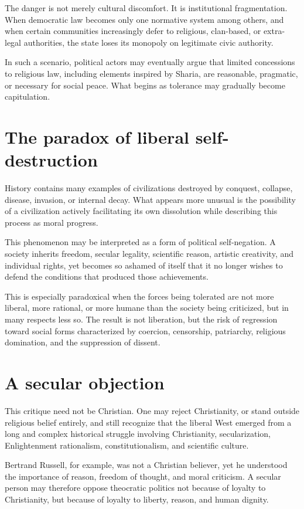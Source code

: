 The danger is not merely cultural discomfort. It is institutional fragmentation. When democratic law becomes only one normative system among others, and when certain communities increasingly defer to religious, clan-based, or extra-legal authorities, the state loses its monopoly on legitimate civic authority.

In such a scenario, political actors may eventually argue that limited concessions to religious law, including elements inspired by Sharia, are reasonable, pragmatic, or necessary for social peace. What begins as tolerance may gradually become capitulation.

\section{The paradox of liberal self-destruction}

History contains many examples of civilizations destroyed by conquest, collapse, disease, invasion, or internal decay. What appears more unusual is the possibility of a civilization actively facilitating its own dissolution while describing this process as moral progress.

This phenomenon may be interpreted as a form of political self-negation. A society inherits freedom, secular legality, scientific reason, artistic creativity, and individual rights, yet becomes so ashamed of itself that it no longer wishes to defend the conditions that produced those achievements.

This is especially paradoxical when the forces being tolerated are not more liberal, more rational, or more humane than the society being criticized, but in many respects less so. The result is not liberation, but the risk of regression toward social forms characterized by coercion, censorship, patriarchy, religious domination, and the suppression of dissent.

\section{A secular objection}

This critique need not be Christian. One may reject Christianity, or stand outside religious belief entirely, and still recognize that the liberal West emerged from a long and complex historical struggle involving Christianity, secularization, Enlightenment rationalism, constitutionalism, and scientific culture.

Bertrand Russell, for example, was not a Christian believer, yet he understood the importance of reason, freedom of thought, and moral criticism. A secular person may therefore oppose theocratic politics not because of loyalty to Christianity, but because of loyalty to liberty, reason, and human dignity.

